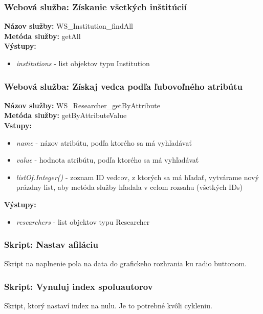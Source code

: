 \documentclass[10pt,oneside,slovak,a4paper]{article}
\begin{document}
\subsubsection{Webová služba: Získanie všetkých inštitúcií}
\textbf{Názov služby:} WS\_Institution\_findAll\\
\textbf{Metóda služby:} getAll\\
\textbf{Výstupy:}
	\begin{itemize}
		\item \textit{institutions} - list objektov typu Institution
	\end{itemize}
	
\subsubsection{Webová služba: Získaj vedca podľa ľubovoľného atribútu}
\textbf{Názov služby:} WS\_Researcher\_getByAttribute\\
\textbf{Metóda služby:} getByAttributeValue\\
\textbf{Vstupy:}
	\begin{itemize}
		\item \textit{name} - názov atribútu, podľa ktorého sa má vyhľadávať
		\item \textit{value} - hodnota atribútu, podľa ktorého sa má vyhľadávať
		\item \textit{listOf.Integer()} - zoznam ID vedcov, z ktorých sa má hľadať, vytvárame nový prázdny list, aby metóda služby hľadala v celom rozsahu (všetkých IDs)
	\end{itemize}
\textbf{Výstupy:}
	\begin{itemize}
		\item \textit{researchers} - list objektov typu Researcher 
	\end{itemize}
	
\subsubsection{Skript: Nastav afiláciu}
Skript na naplnenie pola na data do grafickeho rozhrania ku radio buttonom.

\subsubsection{Skript: Vynuluj index spoluautorov}
Skript, ktorý nastaví index na nulu. Je to potrebné kvôli cykleniu.
\end{document}
